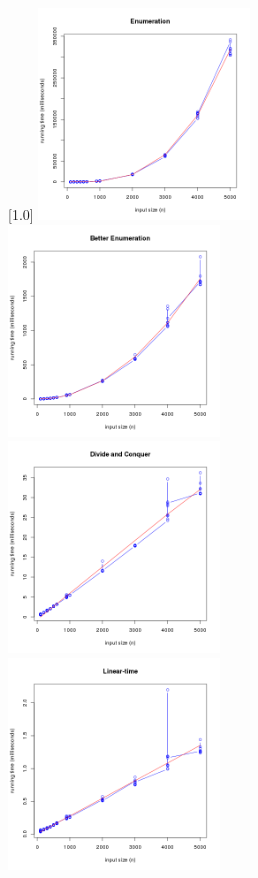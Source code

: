 \documentclass[11pt]{scrreprt}
\begin{document}
\begin{figure}[!htbp]
	\captionsetup{justification=centering,singlelinecheck=off}
	\captionsetup[subfigure]{singlelinecheck=on}
	[1.0\textwidth]{%
		\includegraphics[width=0.50\textwidth]{enumeration.png}%
		\includegraphics[width=0.50\textwidth]{better_enumeration.png}\\
		\includegraphics[width=0.50\textwidth]{divide_n_conquer.png}%
		\includegraphics[width=0.50\textwidth]{linear_time.png}%
	}%
\end{figure}
\end{document}
